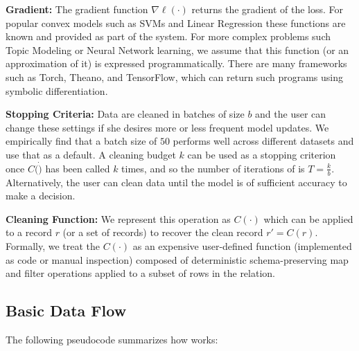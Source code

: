 \noindent\textbf{Gradient:} The gradient function $\nabla\ell(\cdot)$ returns the gradient of the loss. 
For popular convex models such as SVMs and Linear Regression these functions are known and provided as part of the system. 
For more complex problems such Topic Modeling or Neural Network learning, we assume that this function (or an approximation of it) is expressed programmatically. There are many frameworks such as Torch, Theano, and TensorFlow, which can return such programs using symbolic differentiation. 

\vspace{0.25em}

\noindent\textbf{Stopping Criteria: } Data are cleaned in batches of size $b$ and the user can change these settings if she desires more or less frequent model updates.
We empirically find that a batch size of $50$ performs well across different datasets and use that as a default.
A cleaning budget $k$ can be used as a stopping criterion once $C(\dot)$ has been called $k$ times, and so the number of iterations of \sys is $T = \frac{k}{b}$.
Alternatively, the user can clean data until the model is of sufficient accuracy to make a decision.

\vspace{0.25em}

\noindent\textbf{Cleaning Function: } We represent this operation as $C(\cdot)$ which can be applied to a record $r$ (or a set of records) to recover the clean record $r' = C(r)$.
Formally, we treat the $C(\cdot)$ as an expensive user-defined function (implemented as code or manual inspection) composed of deterministic schema-preserving \textsf{map} and \textsf{filter} operations applied to a subset of rows in the relation. 

\subsection{Basic Data Flow} \label{df}
The following pseudocode summarizes how \sys works:

